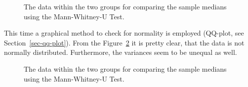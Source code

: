 \documentclass[
  a4paper,
]{scrbook}
\begin{document}
\begin{figure}[H]


\caption{\label{fig-mannu-tst-data}The data within the two groups for
comparing the sample medians using the Mann-Whitney-U Test.}

\end{figure}%

This time a graphical method to check for normality is employed
(QQ-plot, see Section~\ref{sec-qq-plot}). From the
Figure~\ref{fig-mannu-tst-qq} it is pretty clear, that the data is not
normally distributed. Furthermore, the variances seem to be unequal as
well.

\begin{figure}[H]


\caption{\label{fig-mannu-tst-qq}The data within the two groups for
comparing the sample medians using the Mann-Whitney-U Test.}

\end{figure}%
\end{document}

